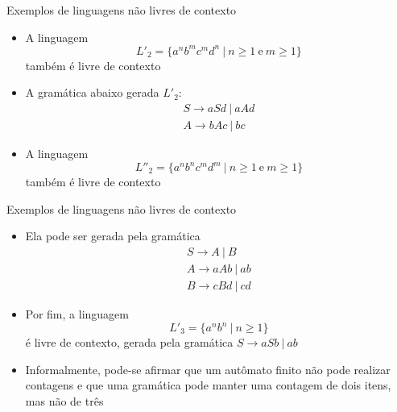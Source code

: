 \begin{frame}[fragile]{Exemplos de linguagens não livres de contexto}

    \begin{itemize}
        \item A linguagem
        \[
            L'_2 = \{ a^nb^mc^md^n\ |\ n\geq 1\ \mbox{e}\ m\geq 1\}
        \]
        também é livre de contexto
        \pause

        \item A gramática abaixo gerada $L'_2$:
        \[
            \begin{array}{l}
                S \to aSd\ |\ aAd \\
                A \to bAc\ |\ bc
            \end{array}
        \]
        \pause

        \item A linguagem
        \[
            L''_2 = \{ a^nb^nc^md^m\ |\ n\geq 1\ \mbox{e}\ m\geq 1\}
        \]
        também é livre de contexto
        \pause

        \end{itemize}

\end{frame}

\begin{frame}[fragile]{Exemplos de linguagens não livres de contexto}

    \begin{itemize}
        \item Ela pode ser gerada pela gramática
        \[
            \begin{array}{l}
                S \to A\ |\ B \\
                A \to aAb\ |\ ab \\
                B \to cBd\ |\ cd
            \end{array}
        \]
        \pause

        \item Por fim, a linguagem
        \[
            L'_3 = \{ a^nb^n\ |\ n\geq 1\}
        \]
        é livre de contexto, gerada pela gramática $S\to aSb\ |\ ab$
        \pause

        \item Informalmente, pode-se afirmar que um autômato finito não pode realizar contagens e que uma gramática pode manter uma contagem de dois itens, mas
            não de três
    \end{itemize}

\end{frame}
